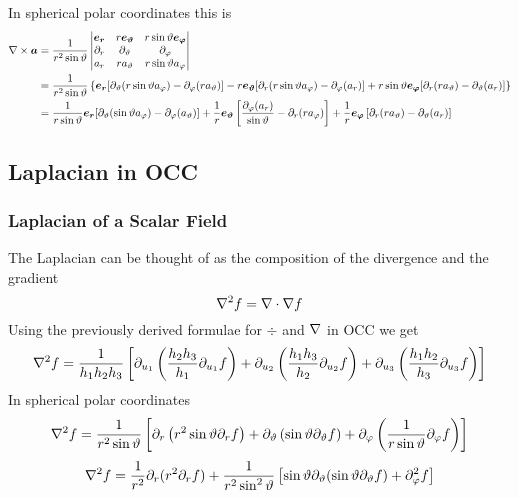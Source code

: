 \documentclass{article}
\begin{document}
    \example
    In spherical polar coordinates this is
    \begin{align*}
        \nabla\times\bm{a} &= \frac{1}{r^2\sin\vartheta}
        \begin{vmatrix}
            \bm{e_{r}} & r\bm{e_{\vartheta}} & r\sin\vartheta\bm{e_{\varphi}}\\
            \partial_r & \partial_\vartheta & \partial_\varphi\\
            a_r & ra_\vartheta & r\sin\vartheta a_\varphi
        \end{vmatrix}\\
        &= \frac{1}{r^2\sin\vartheta}\left\{ \bm{e_{r}}[\partial_\vartheta(r\sin\vartheta a_\varphi) - \partial_\varphi(ra_\vartheta)] - r\bm{e_{\vartheta}}[\partial_r(r\sin\vartheta a_\varphi) - \partial_\varphi(a_r)] + r\sin\vartheta\bm{e_{\varphi}}[\partial_r(ra_\vartheta) - \partial_\vartheta(a_r)]\right\}\\
        &= \frac{1}{r\sin\vartheta}\bm{e_{r}}[\partial_\vartheta(\sin\vartheta a_\varphi) - \partial_\varphi(a_\vartheta)] + \frac{1}{r}\bm{e_{\vartheta}}\left[\frac{\partial_\varphi(a_r)}{\sin\vartheta} - \partial_r(ra_\varphi)\right] + \frac{1}{r}\bm{e_{\varphi}}\left[\partial_r(ra_\vartheta) - \partial_\vartheta(a_r)\right]
    \end{align*}
    
    \subsection{Laplacian in OCC}
    \subsubsection{Laplacian of a Scalar Field}
    The Laplacian can be thought of as the composition of the divergence and the gradient
    \[\laplacian f = \div\grad f\]
    Using the previously derived formulae for \(\div\) and \(\nabla\) in OCC we get
    \[\laplacian f = \frac{1}{h_1h_2h_3}\left[\partial_{u_1}\left(\frac{h_2h_3}{h_1}\partial_{u_1}f\right) + \partial_{u_2}\left(\frac{h_1h_3}{h_2}\partial_{u_2}f\right) + \partial_{u_3}\left(\frac{h_1h_2}{h_3}\partial_{u_3}f\right)\right]\]
    \example
    In spherical polar coordinates
    \[\laplacian f = \frac{1}{r^2\sin\vartheta}\left[\partial_r\left(r^2\sin\vartheta\partial_r f\right) + \partial_\vartheta\left(\sin\vartheta\partial_\vartheta f\right) + \partial_\varphi\left(\frac{1}{r\sin\vartheta}\partial_\varphi f\right)\right]\]
    \[\laplacian f = \frac{1}{r^2}\partial_r(r^2\partial_r f) + \frac{1}{r^2\sin^2\vartheta}\left[\sin\vartheta\partial_\vartheta(\sin\vartheta\partial_\vartheta f) + \partial_\varphi^2f\right]\]
    
\end{document}
